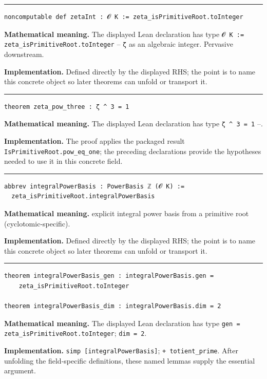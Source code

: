 \documentclass[UTF8,a4paper,11pt,fontset=fandol]{ctexart}
\theoremstyle{definition}
\newcommand{\statementsep}{\par\medskip\hrule\medskip}
\begin{document}
\statementsep
\begin{verbatim}
noncomputable def zetaInt : 𝓞 K := zeta_isPrimitiveRoot.toInteger
\end{verbatim}
\noindent\textbf{Mathematical meaning.} The displayed Lean declaration has type \texttt{𝓞 K := zeta\_\allowbreak{}isPrimitiveRoot.\allowbreak{}toInteger} -- \texttt{ζ} as an algebraic integer. Pervasive downstream.\par
\noindent\textbf{Implementation.} Defined directly by the displayed RHS; the point is to name this concrete object so later theorems can unfold or transport it.\par
\statementsep
\begin{verbatim}
theorem zeta_pow_three : ζ ^ 3 = 1
\end{verbatim}
\noindent\textbf{Mathematical meaning.} The displayed Lean declaration has type \texttt{ζ \textasciicircum{} 3 = 1} --.\par
\noindent\textbf{Implementation.} The proof applies the packaged result \texttt{IsPrimitiveRoot.\allowbreak{}pow\_\allowbreak{}eq\_\allowbreak{}one}; the preceding declarations provide the hypotheses needed to use it in this concrete field.\par
\statementsep
\begin{verbatim}
abbrev integralPowerBasis : PowerBasis ℤ (𝓞 K) :=
  zeta_isPrimitiveRoot.integralPowerBasis
\end{verbatim}
\noindent\textbf{Mathematical meaning.} explicit integral power basis from a primitive root (cyclotomic-specific).\par
\noindent\textbf{Implementation.} Defined directly by the displayed RHS; the point is to name this concrete object so later theorems can unfold or transport it.\par
\statementsep
\begin{verbatim}
theorem integralPowerBasis_gen : integralPowerBasis.gen =
    zeta_isPrimitiveRoot.toInteger

theorem integralPowerBasis_dim : integralPowerBasis.dim = 2
\end{verbatim}
\noindent\textbf{Mathematical meaning.} The displayed Lean declaration has type \texttt{gen = zeta\_\allowbreak{}isPrimitiveRoot.\allowbreak{}toInteger}; \texttt{dim = 2}.\par
\noindent\textbf{Implementation.} \texttt{simp [integralPowerBasis]}; \texttt{+ totient\_\allowbreak{}prime}. After unfolding the field-specific definitions, these named lemmas supply the essential argument.\par
\end{document}
